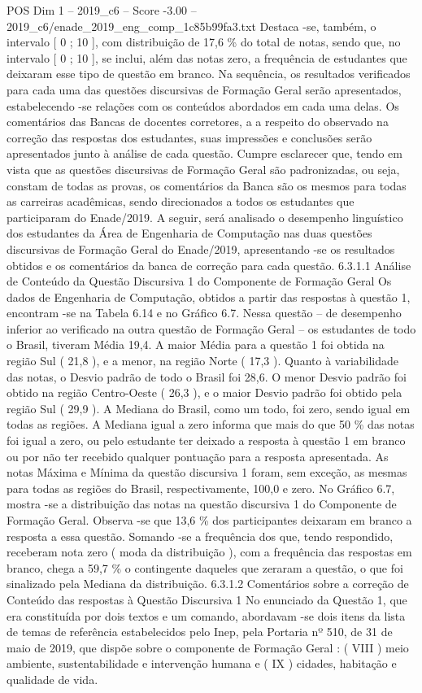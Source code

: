 \begin{textsample}{POS Dim 1 – 2019\_c6 – Score -3.00 – 2019\_c6/enade\_2019\_eng\_comp\_1c85b99fa3.txt}
Destaca -se, também, o intervalo [ 0 ; 10 ], com distribuição de 17,6 \% do total de notas, sendo que, no intervalo [ 0 ; 10 ], se inclui, além das notas zero, a frequência de estudantes que deixaram esse tipo de questão em branco.
Na sequência, os resultados verificados para cada uma das questões discursivas de Formação Geral serão apresentados, estabelecendo -se relações com os conteúdos abordados em cada uma delas.
Os comentários das Bancas de docentes corretores, a a respeito do observado na correção das respostas dos estudantes, suas impressões e conclusões serão apresentados junto à análise de cada questão.
Cumpre esclarecer que, tendo em vista que as questões discursivas de Formação Geral são padronizadas, ou seja, constam de todas as provas, os comentários da Banca são os mesmos para todas as carreiras acadêmicas, sendo direcionados a todos os estudantes que participaram do Enade/2019.
A seguir, será analisado o desempenho linguístico dos estudantes da Área de Engenharia de Computação nas duas questões discursivas de Formação Geral do Enade/2019, apresentando -se os resultados obtidos e os comentários da banca de correção para cada questão. 6.3.1.1 Análise de Conteúdo da Questão Discursiva 1 do Componente de Formação Geral Os dados de Engenharia de Computação, obtidos a partir das respostas à questão 1, encontram -se na Tabela 6.14 e no Gráfico 6.7.
Nessa questão – de desempenho inferior ao verificado na outra questão de Formação Geral – os estudantes de todo o Brasil, tiveram Média 19,4.
A maior Média para a questão 1 foi obtida na região Sul ( 21,8 ), e a menor, na região Norte ( 17,3 ).
Quanto à variabilidade das notas, o Desvio padrão de todo o Brasil foi 28,6.
O menor Desvio padrão foi obtido na região Centro-Oeste ( 26,3 ), e o maior Desvio padrão foi obtido pela região Sul ( 29,9 ).
A Mediana do Brasil, como um todo, foi zero, sendo igual em todas as regiões.
A Mediana igual a zero informa que mais do que 50 \% das notas foi igual a zero, ou pelo estudante ter deixado a resposta à questão 1 em branco ou por não ter recebido qualquer pontuação para a resposta apresentada.
As notas Máxima e Mínima da questão discursiva 1 foram, sem exceção, as mesmas para todas as regiões do Brasil, respectivamente, 100,0 e zero.
No Gráfico 6.7, mostra -se a distribuição das notas na questão discursiva 1 do Componente de Formação Geral.
Observa -se que 13,6 \% dos participantes deixaram em branco a resposta a essa questão.
Somando -se a frequência dos que, tendo respondido, receberam nota zero ( moda da distribuição ), com a frequência das respostas em branco, chega a 59,7 \% o contingente daqueles que zeraram a questão, o que foi sinalizado pela Mediana da distribuição. 6.3.1.2 Comentários sobre a correção de Conteúdo das respostas à Questão Discursiva 1 No enunciado da Questão 1, que era constituída por dois textos e um comando, abordavam -se dois itens da lista de temas de referência estabelecidos pelo Inep, pela Portaria nº 510, de 31 de maio de 2019, que dispõe sobre o componente de Formação Geral : ( VIII ) meio ambiente, sustentabilidade e intervenção humana e ( IX ) cidades, habitação e qualidade de vida.

\end{textsample}
